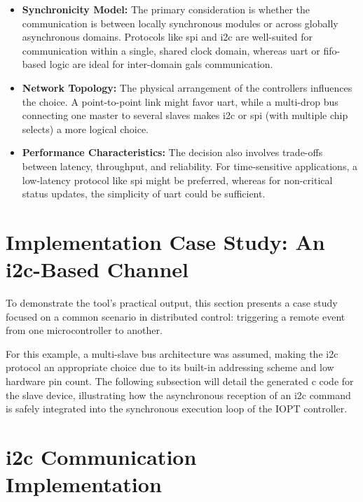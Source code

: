 \begin{itemize}
    \item \textbf{Synchronicity Model:} The primary consideration is whether the communication is between locally synchronous modules or across globally asynchronous domains. Protocols like \gls{spi} and \gls{i2c} are well-suited for communication within a single, shared clock domain, whereas \gls{uart} or \gls{fifo}-based logic are ideal for inter-domain \gls{gals} communication.
    \item \textbf{Network Topology:} The physical arrangement of the controllers influences the choice. A point-to-point link might favor \gls{uart}, while a multi-drop bus connecting one master to several slaves makes \gls{i2c} or \gls{spi} (with multiple chip selects) a more logical choice.
    \item \textbf{Performance Characteristics:} The decision also involves trade-offs between latency, throughput, and reliability. For time-sensitive applications, a low-latency protocol like \gls{spi} might be preferred, whereas for non-critical status updates, the simplicity of \gls{uart} could be sufficient.
\end{itemize}

\section{Implementation Case Study: An \gls{i2c}-Based Channel}
\label{sec:case_study_i2c}

To demonstrate the tool's practical output, this section presents a case study focused on a common scenario in distributed control: triggering a remote event from one microcontroller to another.

For this example, a multi-slave bus architecture was assumed, making the \gls{i2c} protocol an appropriate choice due to its built-in addressing scheme and low hardware pin count. The following subsection will detail the generated \gls{c} code for the slave device, illustrating how the asynchronous reception of an \gls{i2c} command is safely integrated into the synchronous execution loop of the IOPT controller.



\section{\gls{i2c} Communication Implementation}
\label{sec:i2c_implementation}

